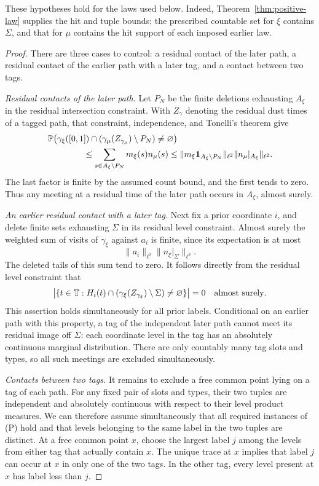 These hypotheses hold for the laws used below.  Indeed,
Theorem~\ref{thm:positive-law} supplies the hit and tuple bounds;
the prescribed countable set for $\xi$ contains $\Sigma$, and that
for $\mu$ contains the hit support of each imposed earlier law.

\begin{proof}
There are three cases to control: a residual contact of the later path,
a residual contact of the earlier path with a later tag, and a contact
between two tags.

\smallskip\noindent\emph{Residual contacts of the later path.}
Let $P_N$ be the finite deletions exhausting $A_\xi$ in the residual
intersection constraint.  With
$Z_\gamma$ denoting the residual dust times of a tagged path, that
constraint, independence, and Tonelli's theorem give
\begin{align*}
 &\Prob\bigl(
 \gamma_\xi([0,1])\cap
 (\gamma_\mu(Z_{\gamma_\mu})\setminus P_N)\ne\varnothing
 \bigr)\\
 &\hspace{15mm}\le
 \sum_{s\in A_\xi\setminus P_N}m_\xi(s)n_\mu(s)
 \le
 \|m_\xi\ind_{A_\xi\setminus P_N}\|_{\ell^2}
 \|n_\mu|_{A_\xi}\|_{\ell^2}.
\end{align*}
The last factor is finite by the assumed count bound, and the first
tends to zero.  Thus any meeting at a residual time of the later path
occurs in $A_\xi$, almost surely.

\smallskip\noindent\emph{An earlier residual contact with a later tag.}
Next fix a prior coordinate $i$, and delete finite sets exhausting
$\Sigma$ in its residual level constraint.  Almost surely the weighted
sum of visits of $\gamma_\xi$ against $a_i$ is finite, since its
expectation is at most
\[
 \|a_i\|_{\ell^2}\|n_\xi|_\Sigma\|_{\ell^2}.
\]
The deleted tails of this sum tend to zero.  It follows directly from
the residual level constraint that
\[
 \bigl|\{t\in\mathbb T:
 H_i(t)\cap(\gamma_\xi(Z_{\gamma_\xi})\setminus\Sigma)
 \ne\varnothing\}\bigr|=0
 \quad\text{almost surely}.
\]
This assertion holds simultaneously for all prior labels.  Conditional
on an earlier path with this property, a tag of the independent later
path cannot meet its residual image off $\Sigma$: each coordinate
level in the tag has an absolutely continuous marginal distribution.
There are only countably many tag slots and types, so all such meetings
are excluded simultaneously.

\smallskip\noindent\emph{Contacts between two tags.}
It remains to exclude a free common point lying on a tag of each path.
For any fixed pair of slots and types, their two tuples are independent
and absolutely continuous with respect to their level product measures.
We can therefore assume simultaneously that all required instances of
\textup{(P)} hold and that levels belonging to the same label in the two
tuples are distinct.  At a free common point $x$, choose the largest
label $j$ among the levels from either tag that actually contain $x$.
The unique trace at $x$ implies that label $j$ can occur at $x$ in only
one of the two tags.  In the other tag, every level present at $x$ has
label less than $j$.


\end{proof}
